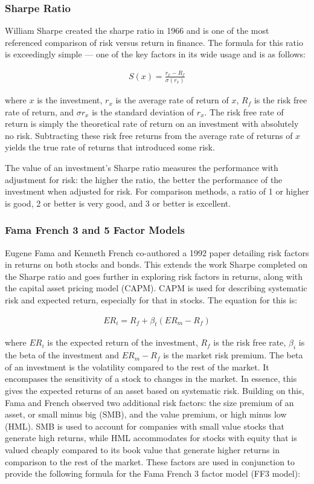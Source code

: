 \documentclass[ oneside,%
                    author={Joshua Felmeden},
                    degree={MEng},
                     title={Semantic Analysis of Financial Headlines Based on Realised Stock Returns},
                  subtitle={}]{dissertation}
\begin{document}
\subsubsection{Sharpe Ratio}
William Sharpe created the sharpe ratio in 1966 and is one of the most referenced comparison of risk versus return in finance. The formula for this ratio is exceedingly simple --- one of the key factors in its wide usage and is as follows:

\begin{align*}
S(x) = \frac{r_x - R_f}{\sigma(r_x)}
\end{align*}

\noindent
where $x$ is the investment, $r_x$ is the average rate of return of $x$, $R_f$ is the risk free rate of return, and $\sigma{r_x}$ is the standard deviation of $r_x$. The risk free rate of return is simply the theoretical rate of return on an investment with absolutely no risk. Subtracting these risk free returns from the average rate of returns of $x$ yields the true rate of returns that introduced some risk.

The value of an investment's Sharpe ratio measures the performance with adjustment for risk: the higher the ratio, the better the performance of the investment when adjusted for risk. For comparison methods, a ratio of 1 or higher is good, 2 or better is very good, and 3 or better is excellent. 

\subsubsection{Fama French 3 and 5 Factor Models}
Eugene Fama and Kenneth French co-authored a 1992 paper detailing risk factors in returns on both stocks and bonds. This extends the work Sharpe completed on the Sharpe ratio and goes further in exploring risk factors in returns, along with the capital asset pricing model (CAPM). CAPM is used for describing systematic risk and expected return, especially for that in stocks. The equation for this is:

\begin{align*}
ER_i = R_f + \beta_t (ER_m - R_f)
\end{align*}

\noindent
where $ER_i$ is the expected return of the investment, $R_f$ is the risk free rate, $\beta_i$ is the beta of the investment and $ER_m - R_f$ is the market risk premium. The beta of an investment is the volatility compared to the rest of the market. It encompases the sensitivity of a stock to changes in the market. In essence, this gives the expected returns of an asset based on systematic risk. Building on this, Fama and French observed two additional risk factors: the size premium of an asset, or small minus big (SMB), and the value premium, or high minus low (HML). SMB is used to account for companies with small value stocks that generate high returns, while HML accommodates for stocks with equity that is valued cheaply compared to its book value that generate higher returns in comparison to the rest of the market. These factors are used in conjunction to provide the following formula for the Fama French 3 factor model (FF3 model):
\end{document}
